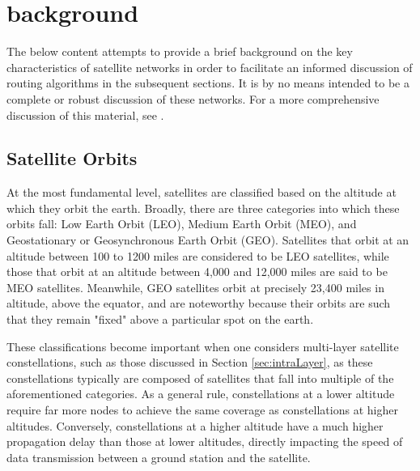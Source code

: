
\section{background}\label{sec:background}
The below content attempts to provide a brief background on the key characteristics of satellite networks in order to facilitate an informed discussion of routing algorithms in the subsequent sections. It is by no means intended to be a complete or robust discussion of these networks. For a more comprehensive discussion of this material, see \cite{elbert_introduction_2008}.

\subsection{Satellite Orbits}\label{subsec:satelliteOrbits}
At the most fundamental level, satellites are classified based on the altitude at which they orbit the earth. Broadly, there are three categories into which these orbits fall: Low Earth Orbit (LEO), Medium Earth Orbit (MEO), and Geostationary or Geosynchronous Earth Orbit (GEO)\cite{stone_introduction_2004}. Satellites that orbit at an altitude between 100 to 1200 miles are considered to be LEO satellites, while those that orbit at an altitude between 4,000 and 12,000 miles are said to be MEO satellites\cite{stone_introduction_2004}. Meanwhile, GEO satellites orbit at precisely 23,400 miles in altitude, above the equator, and are noteworthy because their orbits are such that they remain "fixed" above a particular spot on the earth\cite{stone_introduction_2004}. 

These classifications become important when one considers multi-layer satellite constellations, such as those discussed in Section \ref{sec:intraLayer}, as these constellations typically are composed of satellites that fall into multiple of the aforementioned categories. As a general rule, constellations at a lower altitude require far more nodes to achieve the same coverage as constellations at higher altitudes\cite{elbert_introduction_2008}. Conversely, constellations at a higher altitude have a much higher propagation delay than those at lower altitudes, directly impacting the speed of data transmission between a ground station and the satellite\cite{elbert_introduction_2008}.


